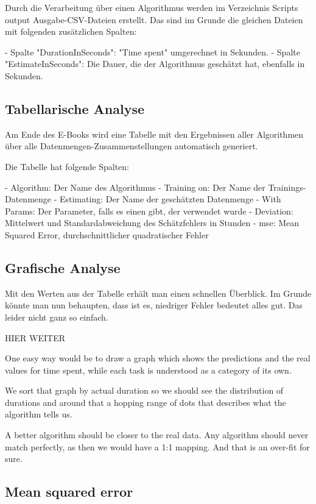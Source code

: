 Durch die Verarbeitung über einen Algorithmus werden im Verzeichnis Scripts\\output
Ausgabe-CSV-Dateien erstellt. Das sind im Grunde die gleichen Dateien mit folgenden
zusätzlichen Spalten:

- Spalte "DurationInSeconds": "Time spent" umgerechnet in Sekunden.
- Spalte "EstimateInSeconds": Die Dauer, die der Algorithmus geschätzt hat, ebenfalls in Sekunden.

\subsection{Tabellarische Analyse}

Am Ende des E-Books wird eine Tabelle mit den Ergebnissen aller Algorithmen über alle 
Datenmengen-Zusammenstellungen automatisch generiert.

Die Tabelle hat folgende Spalten:

- Algorithm: Der Name des Algorithmus
- Training on: Der Name der Trainings-Datenmenge
- Estimating: Der Name der geschätzten Datenmenge
- With Params: Der Parameter, falls es einen gibt, der verwendet wurde
- Deviation: Mittelwert und Standardabweichung des Schätzfehlers in Stunden
- mse: Mean Squared Error, durchschnittlicher quadratischer Fehler

\subsection{Grafische Analyse}

Mit den Werten aus der Tabelle erhält man einen schnellen Überblick. 
Im Grunde könnte man nun behaupten, dass ist es, niedriger Fehler bedeutet alles gut. 
Das leider nicht ganz so einfach.

HIER WEITER

One easy way would be to draw a graph which shows the predictions and
the real values for time spent, while each task is understood as a
category of its own.

We sort that graph by actual duration so we should see the distribution
of durations and around that a hopping range of dots that describes what
the algorithm tells us.

A better algorithm should be closer to the real data. Any algorithm
should never match perfectly, as then we would have a 1:1 mapping. And
that is an over-fit for sure.

\hypertarget{mean-squared-error}{%
\subsection{Mean squared error}\label{mean-squared-error}}

